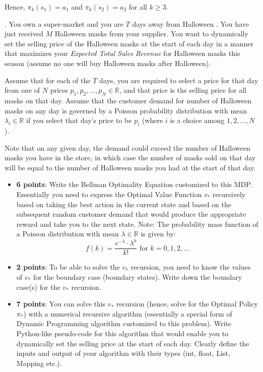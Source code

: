 \documentclass[12pt]{exam}
\begin{document}
\begin{questions}
Hence, $\pi_k(s_1) = a_1$ and $\pi_k(s_2) = a_2$ for all $k \geq 3$.

. You own a super-market and you are $T$ days away from Halloween \smiley . You have just received $M$ Halloween masks from your supplier. You want to dynamically set the selling price of the Halloween masks at the start of each day in a manner that maximizes your {\em Expected Total Sales Revenue} for Halloween masks this season (assume no one will buy Halloween masks after Halloween). 

Assume that for each of the $T$ days, you are required to select a price for that day from one of $N$ prices $p_1, p_2, \ldots, p_N \in \mathbb{R}$, and that price is the selling price for all masks on that day. Assume that the customer demand for number of Halloween masks on any day is governed by a Poisson probability distribution with mean $\lambda_i \in \mathbb{R}$ if you select that day's price to be $p_i$ (where $i$ is a choice among $1, 2, \ldots, N$). 

Note that on any given day, the demand could exceed the number of Halloween masks you have in the store, in which case the number of masks sold on that day will be equal to the number of Halloween masks you had at the start of that day.

 \begin{itemize}
\item {\bf 6 points}: Write the Bellman Optimality Equation customized to this MDP. Essentially you need to express the Optimal Value Function $v_*$ recursively based on taking the best action in the current state and based on the subsequent random customer demand that would produce the appropriate reward and take you to the next state. Note: The probability mass function of a Poisson distribution with mean $\lambda \in \mathbb{R}$ is given by:
 $$f(k) = \frac {e^{-\lambda} \cdot \lambda^k} {k!} \mbox{ for } k = 0, 1, 2, \ldots$$
 \item {\bf 2 points}: To be able to solve the $v_*$ recursion, you need to know the values of $v_*$ for the boundary case (boundary states). Write down the boundary case(s) for the $v_*$ recursion.
\item {\bf 7 points}: You can solve this $v_*$ recursion (hence, solve for the Optimal Policy $\pi_*$) with a numerical recursive algorithm (essentially a special form of Dynamic Programming algorithm customized to this problem). Write Python-like pseudo-code for this algorithm that would enable you to dynamically set the selling price at the start of each day. Clearly define the inputs and output of your algorithm with their types (int, float, List, Mapping etc.).
\end{itemize} 
 

\end{questions}
\end{document}
